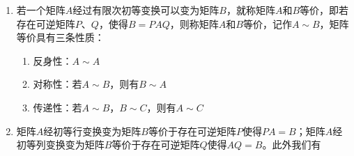 \documentclass[12pt,a4paper,UTF8]{book}
\begin{document}
\begin{enumerate}
\begin{enumerate}
\begin{enumerate}
\[\begin{array}{ccccccc}
\quad&\quad&\quad&\quad&1&\quad&\quad\\
\quad&\quad&\quad&\quad&\quad&\ddots&\quad\\
\quad&\quad&\quad&\quad&\quad&\quad&1\end{array}\right)\begin{array}{c}\quad\\\quad\\\quad\\\leftarrow\text{第}i\text{行}\\\quad\\\quad\\\quad\end{array}\]
\item 以数$k\neq0$乘矩阵$A$的第$j$行然后将它加到第$i$行或以数$k\neq0$乘矩阵$A$的第$i$列然后将它加到第$j$列
\[E\left(ij\left(k\right)\right)=\left(\begin{array}{ccccccc}1&\quad&\quad&\quad&\quad&\quad&\quad\\\quad&\ddots&\quad&\quad&\quad&\quad&\quad\\\quad&\quad&1&\cdots&k&\quad&\quad\\\quad&\quad&\quad&\ddots&\vdots&\quad&\quad\\
\quad&\quad&\quad&\quad&1&\quad&\quad\\
\quad&\quad&\quad&\quad&\quad&\ddots&\quad\\
\quad&\quad&\quad&\quad&\quad&\quad&1\end{array}\right)\begin{array}{c}\quad\\\quad\\\leftarrow\text{第}i\text{行}\\\quad\\\leftarrow\text{第}j\text{行}\\\quad\\\quad\end{array}\]
\end{enumerate}
\item 若一个矩阵$A$经过有限次初等变换可以变为矩阵$B$，就称矩阵$A$和$B$等价，即若存在可逆矩阵$P$、$Q$，使得$B=PAQ$，则称矩阵$A$和$B$等价，记作$A\sim B$，矩阵等价具有三条性质：
\begin{enumerate}
\item 反身性：$A\sim A$
\item 对称性：若$A\sim B$，则有$B\sim A$
\item 传递性：若$A\sim B$，$B\sim C$，则有$A\sim C$
\end{enumerate}
\item 矩阵$A$经初等行变换变为矩阵$B$等价于存在可逆矩阵$P$使得$PA=B$；矩阵$A$经初等列变换变为矩阵$B$等价于存在可逆矩阵$Q$使得$AQ=B$。此外我们有

\end{enumerate}
\end{enumerate}
\end{document}
